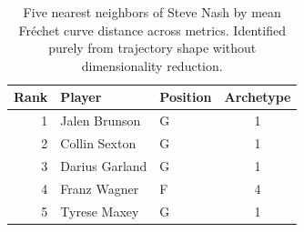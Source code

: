 \begin{table}[htbp]
  \centering\small
  \begin{tabular}{rllc}
    \toprule
    Rank & Player & Position & Archetype \\
    \midrule
    1 & Jalen Brunson & G & 1 \\
    2 & Collin Sexton & G & 1 \\
    3 & Darius Garland & G & 1 \\
    4 & Franz Wagner & F & 4 \\
    5 & Tyrese Maxey & G & 1 \\
    \bottomrule
  \end{tabular}
  \caption{Five nearest neighbors of Steve Nash by mean Fr\'{e}chet curve distance across metrics. Identified purely from trajectory shape without dimensionality reduction.}
  \label{tab:Steve_Nash_frechet_curve_neighbors}
\end{table}


